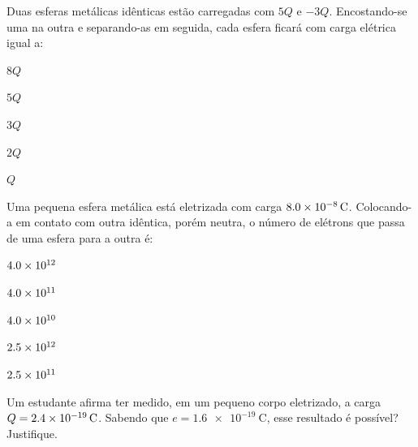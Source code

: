 \begin{questao}[2]{}
Duas esferas metálicas idênticas estão carregadas com $5Q$ e $-3Q$.
Encostando-se uma na outra e separando-as em seguida, cada esfera ficará com
carga elétrica igual a:
\begin{alternativas}[3]
\item $8Q$
\item $5Q$
\item $3Q$
\item $2Q$
\item $Q$
\end{alternativas}
\end{questao}

\begin{questao}[2]{}
Uma pequena esfera metálica está eletrizada com carga $8.0\times 10^{-8}\,\si{\coulomb}$.
Colocando-a em contato com outra idêntica, porém neutra, o número de elétrons que
passa de uma esfera para a outra é:
\begin{alternativas}[3]
\item $4.0\times 10^{12}$
\item $4.0\times 10^{11}$
\item $4.0\times 10^{10}$
\item $2.5\times 10^{12}$
\item $2.5\times 10^{11}$
\end{alternativas}
\end{questao}

\begin{questao}[2]{}
Um estudante afirma ter medido, em um pequeno corpo eletrizado, a carga
$Q = 2.4\times 10^{-19}\,\si{\coulomb}$. Sabendo que $e = \SI{1.6e-19}{\coulomb}$,
esse resultado é possível? Justifique.
\end{questao}

